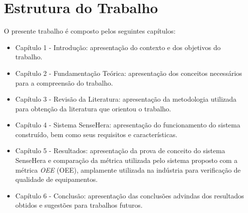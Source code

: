 \section{Estrutura do Trabalho}
O presente trabalho é composto pelos seguintes capítulos:
\begin{itemize}
  \item Capítulo 1 - Introdução: apresentação do contexto e dos objetivos do trabalho.
  \item Capítulo 2 - Fundamentação Teórica: apresentação dos conceitos necessários para a compreensão do
  trabalho.
  \item Capítulo 3 - Revisão da Literatura: apresentação da metodologia utilizada para obtenção da literatura que orientou o trabalho.
  \item Capítulo 4 - Sistema SenseHera: apresentação do funcionamento do sistema construído, bem como seus requisitos e características.
  \item Capítulo 5 - Resultados: apresentação da prova de conceito do sistema SenseHera e comparação da métrica utilizada pelo sistema proposto com a métrica \textit{\acrlong{OEE}} (\acrshort{OEE}), amplamente utilizada na indústria para verificação de qualidade de equipamentos.
  \item Capítulo 6 - Conclusão: apresentação das conclusões advindas dos resultados obtidos e
  sugestões para trabalhos futuros.
\end{itemize}
